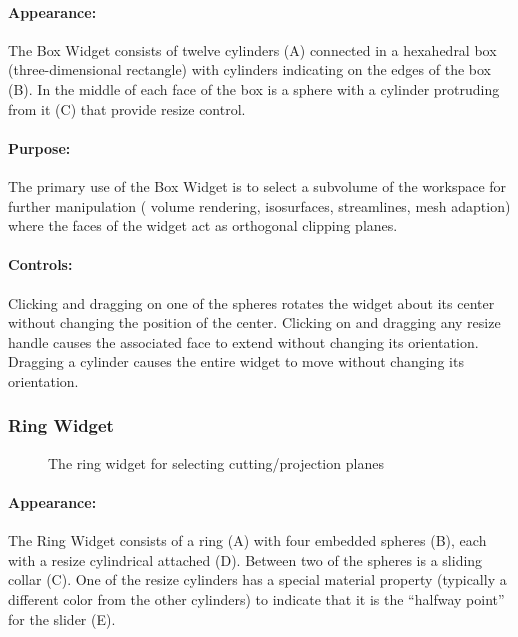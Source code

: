 \paragraph{Appearance: } The Box Widget consists of twelve cylinders (A)
connected in a hexahedral box (three-dimensional rectangle) with cylinders
indicating on the edges of the box (B).  In the middle of each face of the
box is a sphere with a cylinder protruding from it (C) that provide resize
control.

\paragraph{Purpose:} The primary use of the Box Widget is to select a
subvolume of the workspace for further manipulation (\eg{} volume
rendering, isosurfaces, streamlines, mesh adaption) where the faces of the
widget act as orthogonal clipping planes.

\paragraph{Controls: } Clicking and dragging on one of the spheres rotates
the widget about its center without changing the position of the center.
Clicking on and dragging any resize handle
causes the associated face to extend without changing its orientation.
Dragging a cylinder causes the entire widget to move without changing its
orientation.

\subsubsection{Ring Widget}
\label{sec:view-ringwidget} 

\begin{figure}[htb]
  \begin{makeimage}
  \end{makeimage}
  \ringwidget
  \caption{\label{fig:ringwidget} The ring widget for selecting
    cutting/projection planes}
\end{figure}


\paragraph{Appearance: } The Ring Widget consists of a ring (A) with four
embedded spheres (B), each with a resize cylindrical attached (D).  Between
two of the spheres is a sliding collar (C).  One of the resize cylinders
has a special material property (typically a different color from the other
cylinders) to indicate that it is the ``halfway point'' for the slider (E).

